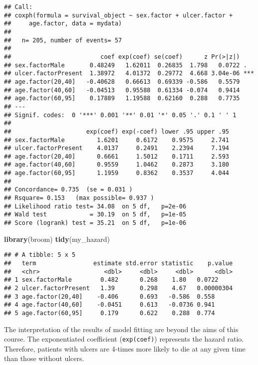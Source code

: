 \documentclass[]{book}
\makeatletter
\newenvironment{Shaded}{\begin{snugshade}}{\end{snugshade}}
\newcommand{\KeywordTok}[1]{\textcolor[rgb]{0.13,0.29,0.53}{\textbf{#1}}}
\newcommand{\NormalTok}[1]{#1}
\newenvironment{kframe}{%
\medskip{}
\setlength{\fboxsep}{.8em}
 \def\at@end@of@kframe{}%
 \ifinner\ifhmode%
  \def\at@end@of@kframe{\end{minipage}}%
  \begin{minipage}{\columnwidth}%
 \fi\fi%
 \def\FrameCommand##1{\hskip\@totalleftmargin \hskip-\fboxsep
 \colorbox{shadecolor}{##1}\hskip-\fboxsep
     \hskip-\linewidth \hskip-\@totalleftmargin \hskip\columnwidth}%
 \MakeFramed {\advance\hsize-\width
   \@totalleftmargin\z@ \linewidth\hsize
   \@setminipage}}%
 {\par\unskip\endMakeFramed%
 \at@end@of@kframe}
\renewenvironment{Shaded}{\begin{kframe}}{\end{kframe}}
\theoremstyle{definition}
\theoremstyle{definition}
\theoremstyle{definition}
\theoremstyle{remark}
\makeatother
\begin{document}
\begin{verbatim}
## Call:
## coxph(formula = survival_object ~ sex.factor + ulcer.factor + 
##     age.factor, data = mydata)
## 
##   n= 205, number of events= 57 
## 
##                         coef exp(coef) se(coef)      z Pr(>|z|)    
## sex.factorMale       0.48249   1.62011  0.26835  1.798   0.0722 .  
## ulcer.factorPresent  1.38972   4.01372  0.29772  4.668 3.04e-06 ***
## age.factor(20,40]   -0.40628   0.66613  0.69339 -0.586   0.5579    
## age.factor(40,60]   -0.04513   0.95588  0.61334 -0.074   0.9414    
## age.factor(60,95]    0.17889   1.19588  0.62160  0.288   0.7735    
## ---
## Signif. codes:  0 '***' 0.001 '**' 0.01 '*' 0.05 '.' 0.1 ' ' 1
## 
##                     exp(coef) exp(-coef) lower .95 upper .95
## sex.factorMale         1.6201     0.6172    0.9575     2.741
## ulcer.factorPresent    4.0137     0.2491    2.2394     7.194
## age.factor(20,40]      0.6661     1.5012    0.1711     2.593
## age.factor(40,60]      0.9559     1.0462    0.2873     3.180
## age.factor(60,95]      1.1959     0.8362    0.3537     4.044
## 
## Concordance= 0.735  (se = 0.031 )
## Rsquare= 0.153   (max possible= 0.937 )
## Likelihood ratio test= 34.08  on 5 df,   p=2e-06
## Wald test            = 30.19  on 5 df,   p=1e-05
## Score (logrank) test = 35.21  on 5 df,   p=1e-06
\end{verbatim}

\begin{Shaded}
\begin{Highlighting}[]
\KeywordTok{library}\NormalTok{(broom)}
\KeywordTok{tidy}\NormalTok{(my_hazard)}
\end{Highlighting}
\end{Shaded}

\begin{verbatim}
## # A tibble: 5 x 5
##   term                estimate std.error statistic    p.value
##   <chr>                  <dbl>     <dbl>     <dbl>      <dbl>
## 1 sex.factorMale        0.482      0.268    1.80   0.0722    
## 2 ulcer.factorPresent   1.39       0.298    4.67   0.00000304
## 3 age.factor(20,40]    -0.406      0.693   -0.586  0.558     
## 4 age.factor(40,60]    -0.0451     0.613   -0.0736 0.941     
## 5 age.factor(60,95]     0.179      0.622    0.288  0.774
\end{verbatim}

The interpretation of the results of model fitting are beyond the aims
of this course. The exponentiated coefficient (\texttt{exp(coef)})
represents the hazard ratio. Therefore, patients with ulcers are 4-times
more likely to die at any given time than those without ulcers.
\end{document}
